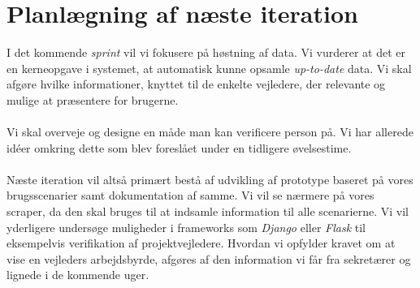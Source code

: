 \documentclass[11pt]{article}
\begin{document}
\section{Planlægning af næste iteration}
I det kommende \textit{sprint} vil vi fokusere på høstning af data. Vi vurderer at det er en kerneopgave i systemet, at automatisk kunne opsamle \textit{up-to-date} data. Vi skal afgøre hvilke informationer, knyttet til de enkelte vejledere, der relevante og mulige at præsentere for brugerne.\\
\\
Vi skal overveje og designe en måde man kan verificere person på. Vi har allerede idéer omkring dette som blev foreslået under en tidligere øvelsestime.\\
\\
Næste iteration vil altså primært bestå af udvikling af prototype baseret på vores brugsscenarier samt dokumentation af samme. Vi vil se nærmere på vores scraper, da den skal bruges til at indsamle information til alle scenarierne. Vi vil yderligere undersøge muligheder i frameworks som \textit{Django} eller \textit{Flask} til eksempelvis verifikation af projektvejledere. Hvordan vi opfylder kravet om at vise en vejleders arbejdsbyrde, afgøres af den information vi får fra sekretærer og lignede i de kommende uger.
\end{document}
